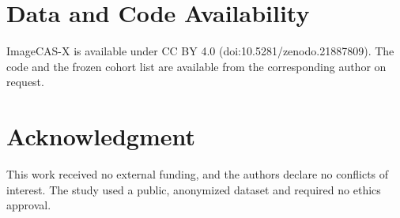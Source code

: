 \documentclass[journal]{IEEEtran}
\begin{document}
\section*{Data and Code Availability}
ImageCAS-X is available under CC BY 4.0 (doi:10.5281/zenodo.21887809). The code and the frozen cohort list are
available from the corresponding author on request.

\section*{Acknowledgment}
This work received no external funding, and the authors declare no conflicts of interest. The study used a public, anonymized dataset and required no ethics
approval.



\end{document}
